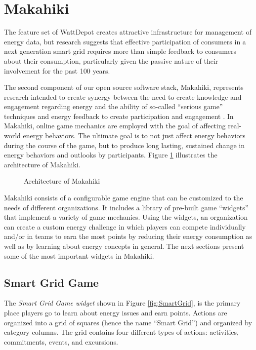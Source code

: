 \section{Makahiki}
The feature set of WattDepot creates attractive infrastructure for management of energy data, but research suggests that effective participation of consumers in a next generation smart grid requires more than simple feedback to consumers about their consumption, particularly given the passive nature of their involvement for the past 100 years.

The second component of our open source software stack, Makahiki, represents research intended to create synergy between the need to create knowledge and engagement regarding energy and the ability of so-called ``serious game'' techniques and energy feedback to create participation and engagement \cite{Deterding2011mt,darby-review-2006,Faruqui09,petersen-dorm-energy-reduction}. In Makahiki, online game mechanics are employed with the goal of affecting real-world energy behaviors.  The ultimate goal is to not just affect energy behaviors during the course of the game, but to produce long lasting, sustained change in energy behaviors and outlooks by participants. Figure \ref{fig:makahiki-architecture} illustrates the architecture of Makahiki.

\begin{figure}
\begin{center}
\end{center}
\caption{Architecture of Makahiki}
\label{fig:makahiki-architecture}
\end{figure}

Makahiki consists of a configurable game engine that can be customized to the needs of different organizations.  It includes a library of pre-built game ``widgets'' that implement a variety of game mechanics.  Using the widgets, an organization can create a custom energy challenge in which players can compete individually and/or in teams to earn the most points by reducing their energy consumption as well as by learning about energy concepts in general.  The next sections present some of the most important widgets in Makahiki.

\subsection{Smart Grid Game}

The {\em Smart Grid Game widget} shown in Figure \ref{fig:SmartGrid}, is the primary place players go to learn about energy issues and earn points. Actions are organized into a grid of squares (hence the name ``Smart Grid'') and organized by category columns. The grid contains four different types of actions: activities, commitments, events, and excursions.

